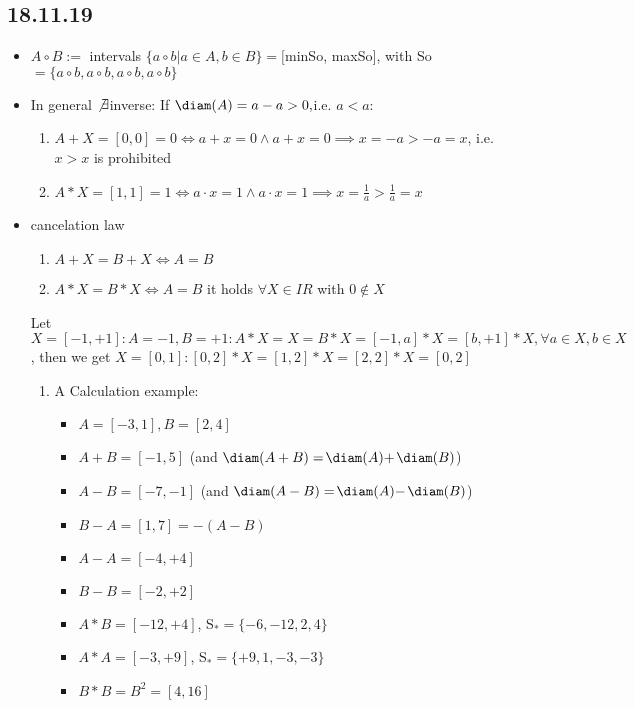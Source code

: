 \subsection*{18.11.19}
\begin{itemize}
	\item $A\circ B:=$ intervals $\{a\circ b| a\in A, b\in B\}=[$minSo, maxSo$]$, with So$=\{a\circ b,a\circ b,a\circ b,a\circ b\}$
	\item In general $\not \exists $inverse:
	 If $\diam(A)=a-a>0, $i.e. $a<a$:
	\begin{enumerate}
		\item $A+X=[0,0]=0 \iff a+x=0 \land a+x=0 \implies x=-a>-a=x$, i.e. $x>x$ is prohibited
		\item $A*X=[1,1]=1 \iff a\cdot x=1 \land a\cdot x=1 \implies x=\frac{1}{a}>\frac{1}{a}=x$ 
	\end{enumerate}
	\item cancelation law %
	\begin{enumerate}
		\item $A+X=B+X \iff A=B$
		\item $A*X=B*X \iff A=B$ it holds $\forall X\in IR$ with $0\not \in X$
	\end{enumerate}
	\begin{*example}
		Let $X=[-1,+1]: A=-1,B=+1: A*X=X=B*X=[-1,a]*X=[b,+1]*X, \forall a\in X, b\in X$, then we get $X=[0,1]: [0,2]*X=[1,2]*X=[2,2]*X=[0,2]$
	\end{*example}
	\begin{*example}
		\begin{enumerate}
			\item A Calculation example: 
			\begin{itemize}
				\item $A=[-3,1], B=[2,4]$
				\item $A+B=[-1,5]$ (and $\diam(A+B)=$$\diam(A)+$$\diam(B)$)
				\item $A-B=[-7,-1]$ (and $\diam(A-B)=$$\diam(A)-$$\diam(B)$)
				\item $B-A=[1,7]=-(A-B)$
				\item $A-A=[-4,+4]$
				\item $B-B=[-2,+2]$
				\item $A*B=[-12,+4]$, S$_*=\{-6,-12,2,4\}$
				\item $A*A=[-3,+9]$, S$_*=\{+9,1,-3,-3\}$
				\item $B*B=B^2=[4,16]$

\end{itemize}
\end{enumerate}
\end{*example}
\end{itemize}
